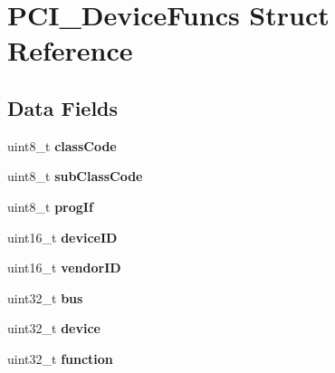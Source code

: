 \hypertarget{structPCI__DeviceFuncs}{}\section{P\+C\+I\+\_\+\+Device\+Funcs Struct Reference}
\label{structPCI__DeviceFuncs}
\subsection*{Data Fields}
\begin{DoxyCompactItemize}
\item 
uint8\+\_\+t {\bfseries class\+Code}\hypertarget{structPCI__DeviceFuncs_adb14bb1f30d26dfb5c58c75ed548d23a}{}\label{structPCI__DeviceFuncs_adb14bb1f30d26dfb5c58c75ed548d23a}

\item 
uint8\+\_\+t {\bfseries sub\+Class\+Code}\hypertarget{structPCI__DeviceFuncs_a1cd08f902bc8d2bbe9d6b82c82435dc8}{}\label{structPCI__DeviceFuncs_a1cd08f902bc8d2bbe9d6b82c82435dc8}

\item 
uint8\+\_\+t {\bfseries prog\+If}\hypertarget{structPCI__DeviceFuncs_affdb3f288a161e563c1bf1491cce17ff}{}\label{structPCI__DeviceFuncs_affdb3f288a161e563c1bf1491cce17ff}

\item 
uint16\+\_\+t {\bfseries device\+ID}\hypertarget{structPCI__DeviceFuncs_a4f01bf12c16893c0fa99f9909d1ad953}{}\label{structPCI__DeviceFuncs_a4f01bf12c16893c0fa99f9909d1ad953}

\item 
uint16\+\_\+t {\bfseries vendor\+ID}\hypertarget{structPCI__DeviceFuncs_acc2b6a144032983dd7e855e3e70e3cf0}{}\label{structPCI__DeviceFuncs_acc2b6a144032983dd7e855e3e70e3cf0}

\item 
uint32\+\_\+t {\bfseries bus}\hypertarget{structPCI__DeviceFuncs_aa1536e3b88e1eb00cae30d6f4e9417c2}{}\label{structPCI__DeviceFuncs_aa1536e3b88e1eb00cae30d6f4e9417c2}

\item 
uint32\+\_\+t {\bfseries device}\hypertarget{structPCI__DeviceFuncs_af8e46e6d91eadcba06ec76e03ede7f80}{}\label{structPCI__DeviceFuncs_af8e46e6d91eadcba06ec76e03ede7f80}

\item 
uint32\+\_\+t {\bfseries function}\hypertarget{structPCI__DeviceFuncs_ad94f63cba21bbcac524b2fec52da1a47}{}\label{structPCI__DeviceFuncs_ad94f63cba21bbcac524b2fec52da1a47}


\end{DoxyCompactItemize}

